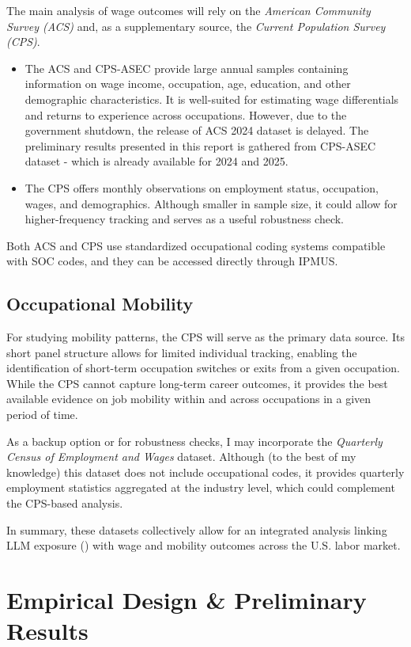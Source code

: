 \documentclass[12pt]{article}
\begin{document}
The main analysis of wage outcomes will rely on the \textit{American Community Survey (ACS)} and, as a supplementary source, the \textit{Current Population Survey (CPS)}.  
\begin{itemize}[leftmargin=*]
    \item The ACS and CPS-ASEC provide large annual samples containing information on wage income, occupation, age, education, and other demographic characteristics. It is well-suited for estimating wage differentials and returns to experience across occupations. However, due to the government shutdown, the release of ACS 2024 dataset is delayed. The preliminary results presented in this report is gathered from CPS-ASEC dataset - which is already available for 2024 and 2025.
    \item The CPS offers monthly observations on employment status, occupation, wages, and demographics. Although smaller in sample size, it could allow for higher-frequency tracking and serves as a useful robustness check.  
\end{itemize}

Both ACS and CPS use standardized occupational coding systems compatible with SOC codes, and they can be accessed directly through IPMUS. 
\subsection{Occupational Mobility}
For studying mobility patterns, the CPS will serve as the primary data source. Its short panel structure allows for limited individual tracking, enabling the identification of short-term occupation switches or exits from a given occupation. While the CPS cannot capture long-term career outcomes, it provides the best available evidence on job mobility within and across occupations in a given period of time.  

As a backup option or for robustness checks, I may incorporate the \textit{Quarterly Census of Employment and Wages} dataset. Although (to the best of my knowledge) this dataset does not include occupational codes, it provides quarterly employment statistics aggregated at the industry level, which could complement the CPS-based analysis.

In summary, these datasets collectively allow for an integrated analysis linking LLM exposure (\cite{eloundou2024gpts}) with wage and mobility outcomes across the U.S. labor market. 


\section{Empirical Design \& Preliminary Results}
\end{document}
